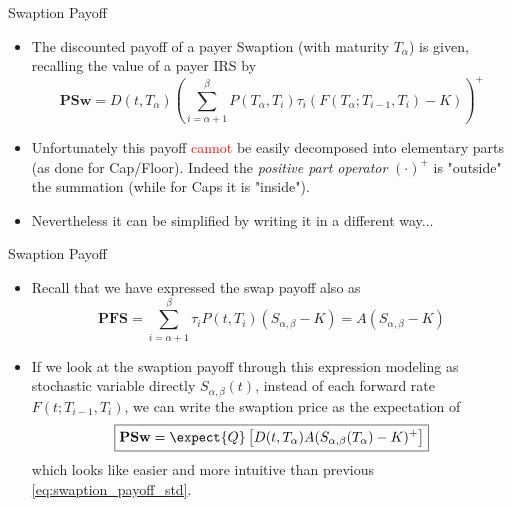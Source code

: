 \documentclass{beamer}
\begin{document}
\begin{frame}{Swaption Payoff}
\begin{itemize}
	\item<1-> The discounted payoff of a payer Swaption (with maturity $T_\alpha$) is given, recalling the value of a payer IRS by %
	\begin{equation}
		\textbf{PSw}=D(t,T_\alpha)\left(\sum_{i=\alpha+1}^\beta P(T_\alpha,T_i)\tau_i (F(T_\alpha;T_{i-1},T_i) - K)\right)^+
		\label{eq:swaption_payoff_std}
	\end{equation}
	\item<2-> Unfortunately this payoff \textcolor{red}{cannot} be easily decomposed into elementary parts (as done for Cap/Floor). Indeed the \emph{positive part operator} $(\cdot)^+$ is "outside" the summation (while for Caps it is "inside").
	\item<3-> Nevertheless it can be simplified by writing it in a different way...
\end{itemize}
\end{frame}

\begin{frame}{Swaption Payoff}
\begin{itemize}
	\item<1-> Recall that we have expressed the swap payoff also as %
	\begin{equation*}
	\textbf{PFS}=\sum_{i=\alpha+1}^\beta \tau_i P(t,T_i)(S_{\alpha,\beta}-K) = A(S_{\alpha,\beta}-K)
	\end{equation*}
	\item<2-> If we look at the swaption payoff through this expression modeling as stochastic variable directly $S_{\alpha,\beta}(t)$, instead of each forward rate $F(t;T_{i-1},T_i)$, we can write the swaption price as the expectation of
	\begin{equation}
		\boxed{\textbf{PSw}=\expect{Q}\left[D(t,T_\alpha)A (S_{\alpha,\beta}(T_\alpha)-K)^+\right]}
	\end{equation}
	which looks like easier and more intuitive than previous \cref{eq:swaption_payoff_std}.
\end{itemize}
\end{frame}
\end{document}
